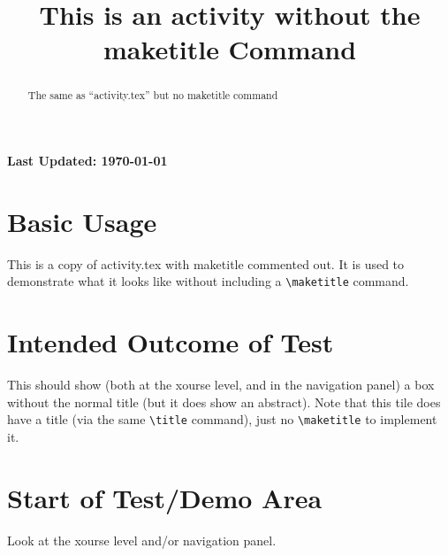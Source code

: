 \documentclass{ximera}
\title{This is an activity without the maketitle Command}
\begin{document}
\begin{abstract}
    The same as ``activity.tex'' but no maketitle command
\end{abstract}

{{\Huge \bfseries Last Updated: \today}} \\


\section{Basic Usage}
This is a copy of activity.tex with maketitle commented out. 
It is used to demonstrate what it looks like without including a \verb|\maketitle| command.\\

\section{Intended Outcome of Test}
This should show (both at the xourse level, and in the navigation panel) a box without the normal title (but it does show an abstract).
Note that this tile does have a title (via the same \verb|\title| command), just no \verb|\maketitle| to implement it.

\section{Start of Test/Demo Area}
Look at the xourse level and/or navigation panel.

\hrulefill
\end{document}
